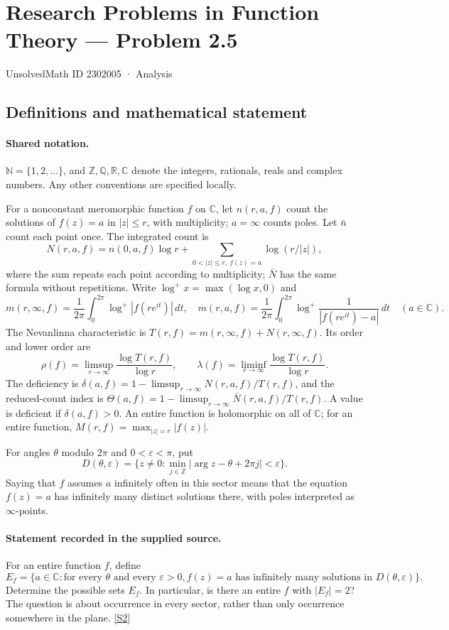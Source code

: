 \documentclass[11pt]{article}
\newcommand{\sref}[2]{\hyperlink{source:#1:#2}{[S#2]}}
\begin{document}
\setcounter{section}{2302004}
\section{Research Problems in Function Theory — Problem 2.5}\label{2302005}
{\small\sffamily UnsolvedMath ID 2302005 · Analysis}
\subsection{Definitions and mathematical statement}

\paragraph{Shared notation.}$\mathbb N=\{1,2,\ldots\}$, and $\mathbb Z,\mathbb Q,\mathbb R,\mathbb C$ denote the integers, rationals, reals and complex numbers. Any other conventions are specified locally.


For a nonconstant meromorphic function $f$ on $\mathbb C$, let $n(r,a,f)$ count the solutions of $f(z)=a$ in $|z|\le r$, with multiplicity; $a=\infty$ counts poles. Let $\bar n$ count each point once. The integrated count is
\[
 N(r,a,f)=n(0,a,f)\log r+\sum_{0<|z|\le r,\ f(z)=a}\log(r/|z|),
\]
where the sum repeats each point according to multiplicity; $\bar N$ has the same formula without repetitions. Write $\log^+x=\max(\log x,0)$ and
\[
 m(r,\infty,f)=\frac1{2\pi}\int_0^{2\pi}\log^+|f(re^{it})|\,dt,\quad
 m(r,a,f)=\frac1{2\pi}\int_0^{2\pi}\log^+\frac1{|f(re^{it})-a|}\,dt\quad(a\in\mathbb C).
\]
The Nevanlinna characteristic is $T(r,f)=m(r,\infty,f)+N(r,\infty,f)$. Its order and lower order are
\[
 \rho(f)=\limsup_{r\to\infty}\frac{\log T(r,f)}{\log r},\qquad
 \lambda(f)=\liminf_{r\to\infty}\frac{\log T(r,f)}{\log r}.
\]
The deficiency is $\delta(a,f)=1-\limsup_{r\to\infty}N(r,a,f)/T(r,f)$, and the reduced-count index is $\Theta(a,f)=1-\limsup_{r\to\infty}\bar N(r,a,f)/T(r,f)$. A value is deficient if $\delta(a,f)>0$. An entire function is holomorphic on all of $\mathbb C$; for an entire function, $M(r,f)=\max_{|z|=r}|f(z)|$.

For angles $\theta$ modulo $2\pi$ and $0<\varepsilon<\pi$, put
\[
 D(\theta,\varepsilon)=\{z\ne0:\min_{j\in\mathbb Z}|\arg z-\theta+2\pi j|<\varepsilon\}.
\]
Saying that $f$ assumes $a$ infinitely often in this sector means that the equation $f(z)=a$ has infinitely many distinct solutions there, with poles interpreted as $\infty$-points.
\paragraph{Statement recorded in the supplied source.}
For an entire function $f$, define
\[
 E_f=\{a\in\mathbb C:\text{for every }\theta\text{ and every }\varepsilon>0,
             f(z)=a\text{ has infinitely many solutions in }D(\theta,\varepsilon)\}.
\]
Determine the possible sets $E_f$. In particular, is there an entire $f$ with $|E_f|=2$? The question is about occurrence in every sector, rather than only occurrence somewhere in the plane. \sref{2302005}{2}
\end{document}
